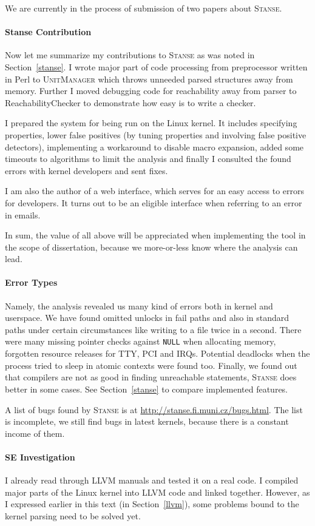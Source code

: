\documentclass[11pt,a4paper]{article}
\newcommand{\stan}{\textsc{Stanse}\xspace}
\begin{document}
We are currently in the process of submission of two papers about \stan.

\paragraph{Stanse Contribution}
Now let me summarize my contributions to \stan as was noted in
Section~\ref{stanse}. I wrote major part of code processing from preprocessor
written in Perl to \textsc{UnitManager} which throws unneeded parsed
structures away from memory. Further I moved debugging code for reachability
away from parser to ReachabilityChecker to demonstrate how easy is to write a
checker.

I prepared the system for being run on the Linux kernel. It includes
specifying properties, lower false positives (by tuning properties and
involving false positive detectors), implementing a workaround to disable
macro expansion, added some timeouts to algorithms to limit the analysis and
finally I consulted the found errors with kernel developers and sent fixes.

I am also the author of a web interface, which serves for an easy access to
errors for developers. It turns out to be an eligible interface when referring
to an error in emails.

In sum, the value of all above will be appreciated when implementing the tool
in the scope of dissertation, because we more-or-less know where the analysis
can lead.

\paragraph{Error Types} Namely, the analysis revealed us many kind of errors
both in kernel and userspace. We have found omitted unlocks in fail paths and
also in standard paths under certain circumstances like writing to a file
twice in a second. There were many missing pointer checks against
\texttt{NULL} when allocating memory, forgotten resource releases for TTY,
PCI and IRQs. Potential deadlocks when the process tried to sleep in atomic
contexts were found too. Finally, we found out that compilers are not as good
in finding unreachable statements, \stan does better in some cases. See
Section~\ref{stanse} to compare implemented features.

A list of bugs found by \stan is at \url{http://stanse.fi.muni.cz/bugs.html}.
The list is incomplete, we still find bugs in latest kernels, because there
is a constant income of them.

\paragraph{SE Investigation}
I already read through LLVM manuals and tested it on a real code. I compiled
major parts of the Linux kernel into LLVM code and linked together. However,
as I expressed earlier in this text (in Section~\ref{llvm}), some problems
bound to the kernel parsing need to be solved yet.
\end{document}
